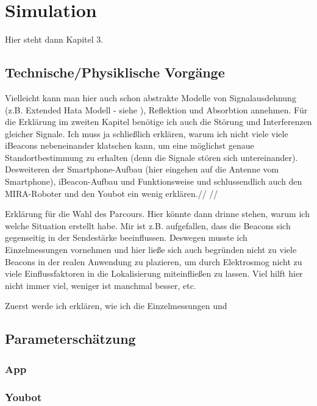 \chapter{Simulation}
Hier steht dann Kapitel 3.

\section{Technische/Physiklische Vorgänge}
Vielleicht kann man hier auch schon abstrakte Modelle von Signalausdehnung (z.B. Extended Hata Modell - siehe ), Reflektion und Absorbtion annehmen. Für die Erklärung im zweiten Kapitel benötige ich auch die Störung und Interferenzen gleicher Signale. Ich muss ja schließlich erklären, warum ich nicht viele viele iBeacons nebeneinander klatschen kann, um eine möglichst genaue Standortbestimmung zu erhalten (denn die Signale stören sich untereinander).  Desweiteren der Smartphone-Aufbau (hier eingehen auf die Antenne vom Smartphone), iBeacon-Aufbau und Funktionsweise und schlussendlich auch den MIRA-Roboter und den Youbot ein wenig erklären.// //

Erklärung für die Wahl des Parcours. Hier könnte dann drinne stehen, warum ich welche Situation erstellt habe. Mir ist z.B. aufgefallen, dass die Beacons sich gegenseitig in der Sendestärke beeinflussen. Deswegen musste ich Einzelmessungen vornehmen und hier ließe sich auch begründen nicht zu viele Beacons in der realen Anwendung zu plazieren, um durch Elektrosmog nicht zu viele Einflussfaktoren in die Lokalisierung miteinfließen zu lassen. Viel hilft hier nicht immer viel, weniger ist manchmal besser, etc.

Zuerst werde ich erklären, wie ich die Einzelmessungen und 

\section{Parameterschätzung}
\subsection{App}
\subsection{Youbot}

    